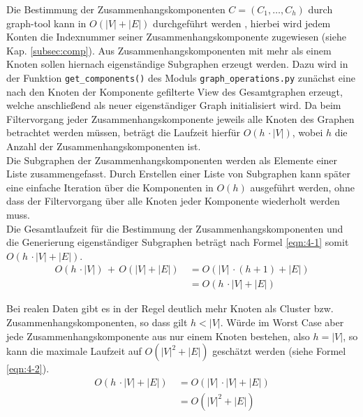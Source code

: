 Die Bestimmung der Zusammenhangskomponenten $C = (C_{1}, \dots , C_{h})$ durch graph-tool kann in $ O(|V| + |E|) $ durchgeführt werden \cite{docs_graph_tool}, hierbei wird jedem Konten die Indexnummer seiner Zusammenhangskomponente zugewiesen (siehe Kap. \ref{subsec:comp}). Aus Zusammenhangskomponenten mit mehr als einem Knoten sollen hiernach eigenständige Subgraphen erzeugt werden. Dazu wird in der Funktion \lstinline|get_components()| des Moduls \lstinline|graph_operations.py| zunächst eine nach den Knoten der Komponente gefilterte View des Gesamtgraphen erzeugt, welche anschließend als neuer eigenständiger Graph initialisiert wird. Da beim Filtervorgang jeder Zusammenhangskomponente jeweils alle Knoten des Graphen betrachtet werden müssen, beträgt die Laufzeit hierfür $ O(h \, \cdotp |V|) $, wobei $h$ die Anzahl der Zusammenhangskomponenten ist. \\

Die Subgraphen der Zusammenhangskomponenten werden als Elemente einer Liste zusammengefasst. Durch Erstellen einer Liste von Subgraphen kann später eine einfache Iteration über die Komponenten in $ O(h) $ ausgeführt werden, ohne dass der Filtervorgang über alle Knoten jeder Komponente wiederholt werden muss. \\

Die Gesamtlaufzeit für die Bestimmung der Zusammenhangskomponenten und die Generierung eigenständiger Subgraphen beträgt nach Formel \eqref{eqn:4-1} somit $ O(h \, \cdotp |V| + |E|) $. 
\begin{equation} \label{eqn:4-1}
\tag{4-1}
\begin{aligned}
 O(h \, \cdotp |V|) \, + \, O(|V| + |E|) &\ {} = O(|V| \, \cdotp (h + 1) +|E|)\\
 &\ = O(h \, \cdotp |V| + |E|)
 \end{aligned}
\end{equation}

Bei realen Daten gibt es in der Regel deutlich mehr Knoten als Cluster bzw. Zusammenhangskomponenten, so dass gilt $ h < |V| $. Würde im Worst Case aber jede Zusammenhangskomponente aus nur einem Knoten bestehen, also $ h = |V| $, so kann die maximale Laufzeit auf $ O(|V|^2 + |E|) $ geschätzt werden (siehe Formel \eqref{eqn:4-2}).\\
\begin{equation} \label{eqn:4-2}
\tag{4-2}
\begin{aligned}
O(h \, \cdotp |V| + |E|) &\ {} = O(|V| \, \cdotp |V| + |E|)\\
&\ = O(|V|^2 + |E|) 
\end{aligned}
\end{equation}

